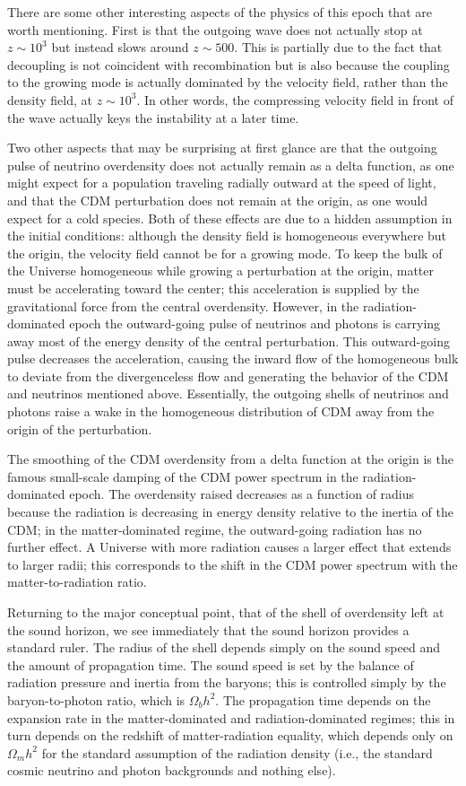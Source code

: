 \documentclass[a4paper,11pt]{article}
\begin{document}
{\noindent}There are some other interesting aspects of the physics of this epoch that are worth mentioning. First is that the outgoing wave does not actually stop at $z\sim10^3$ but instead slows around $z\sim500$. This is partially due to the fact that decoupling is not coincident with recombination but is also because the coupling to the growing mode is actually dominated by the velocity field, rather than the density field, at $z\sim10^3$. In other words, the compressing velocity field in front of the wave actually keys the instability at a later time.

{\noindent}Two other aspects that may be surprising at first
glance are that the outgoing pulse of neutrino overdensity does not actually remain as a delta function, as one might expect for a population traveling radially outward at the speed of light, and that the CDM perturbation does not remain at the origin, as one would expect for a cold species. Both of these effects are due to a hidden assumption in the initial conditions: although the density field is homogeneous everywhere but the origin, the velocity field cannot be for a growing mode. To keep the bulk of the Universe homogeneous while growing a perturbation at the origin, matter
must be accelerating toward the center; this acceleration is supplied by the gravitational force from the central overdensity. However, in the radiation-dominated epoch the outward-going pulse of neutrinos and photons is carrying away most of the energy density of the central perturbation. This outward-going pulse decreases the acceleration, causing the inward flow of the homogeneous bulk to deviate from the divergenceless flow and generating the behavior of the CDM and neutrinos mentioned above. Essentially,
the outgoing shells of neutrinos and photons raise a wake in the homogeneous distribution of CDM away from the origin
of the perturbation.

{\noindent}The smoothing of the CDM overdensity from a delta function at the origin is the famous small-scale damping of the CDM power spectrum in the radiation-dominated epoch. The overdensity raised decreases as a function of radius because the radiation is decreasing in energy density relative to the inertia of the CDM; in the matter-dominated regime, the outward-going radiation has no further effect. A Universe with more radiation causes a larger effect that extends to larger radii; this corresponds to the shift in the CDM power spectrum with the matter-to-radiation ratio.

{\noindent}Returning to the major conceptual point, that of the shell of overdensity left at the sound horizon, we see immediately that the sound horizon provides a standard ruler. The radius of the shell depends simply on the sound speed and the amount of propagation time. The sound speed is set by the balance of radiation pressure and inertia from the baryons; this is controlled simply by the baryon-to-photon ratio, which is $\Omega_bh^2$. The propagation time depends on the expansion rate in the matter-dominated and radiation-dominated regimes; this in turn depends on the redshift of matter-radiation equality, which depends only on $\Omega_mh^2$ for the standard assumption of the radiation density (i.e., the standard cosmic neutrino and photon backgrounds and nothing else).
\end{document}
